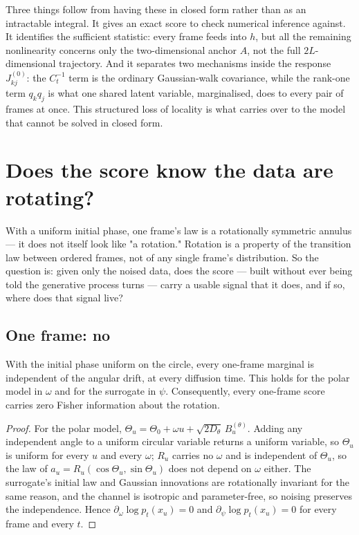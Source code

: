 Three things follow from having these in closed form rather than as an
intractable integral. It gives an exact score to check numerical inference
against. It identifies the sufficient statistic: every frame feeds into $h$,
but all the remaining nonlinearity concerns only the two-dimensional anchor
$A$, not the full $2L$-dimensional trajectory. And it separates two
mechanisms inside the response $J_{kj}^{(0)}$: the $C_t^{-1}$ term is the
ordinary Gaussian-walk covariance, while the rank-one term $q_kq_j$ is what
one shared latent variable, marginalised, does to every pair of frames at
once. This structured loss of locality is what
carries over to the model that cannot be solved in closed form.

\section{Does the score know the data are rotating?}
\label{sec:ring-return-original}

 With a uniform initial phase, one
frame's law is a rotationally symmetric annulus --- it does not itself look
like "a rotation." Rotation is a property of the transition law between
ordered frames, not of any single frame's distribution. So the question
is: given only the noised data, does the score --- built without
ever being told the generative process turns --- carry a usable signal that
it does, and if so, where does that signal live?

\subsection{One frame: no}
\label{sec:ring-marginal-blindness}

\begin{theorem}
\label{thm:ring-marginal-blindness}
With the initial phase uniform on the circle, every one-frame marginal is
independent of the angular drift, at every diffusion time. This holds for
the polar model in $\omega$ and for the surrogate in $\psi$. Consequently,
every one-frame score carries zero Fisher information about the rotation.
\end{theorem}

\begin{proof}
For the polar model, $\Theta_u=\Theta_0+\omega u+\sqrt{2D_\theta}\,B_u^{(\theta)}$.
Adding any independent angle to a uniform circular variable returns a
uniform variable, so $\Theta_u$ is uniform for every $u$ and every $\omega$;
$R_u$ carries no $\omega$ and is independent of $\Theta_u$, so the law of
$a_u=R_u(\cos\Theta_u,\sin\Theta_u)$ does not depend on $\omega$ either. The
surrogate's initial law and Gaussian innovations are rotationally invariant
for the same reason, and the channel is isotropic and parameter-free, so
noising preserves the independence. Hence $\partial_\omega\log p_t(x_u)=0$
and $\partial_\psi\log p_t(x_u)=0$ for every frame and every $t$.
\end{proof}



